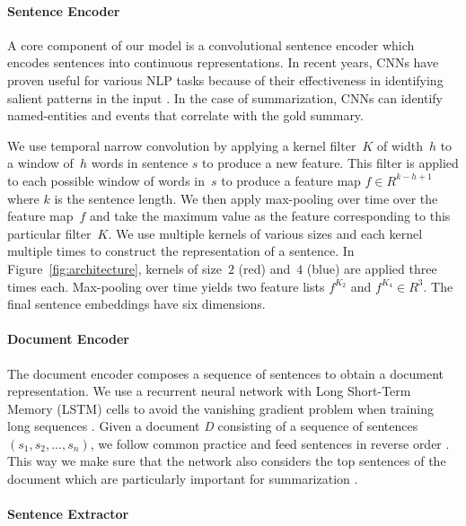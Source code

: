 \documentclass[11pt,a4paper]{article}
\newcommand\doc{{\it D }}
\begin{document}
\paragraph{Sentence Encoder}
A core component of our model is a convolutional sentence encoder
which encodes sentences into continuous representations. In recent
years, CNNs have proven useful for various NLP tasks
\cite{nlpscratch,kim-emnlp14,kalchbrenner-acl14,zhang-nips15,lei-emnlp15,kim-aaai16,jp-acl16}
because of their effectiveness in identifying salient patterns in the
input \cite{showattendtell}. In the case of summarization, CNNs can
identify named-entities and events that correlate with the gold
summary.

We use temporal narrow convolution by applying a kernel filter~$K$ of
width~$h$ to a window of~$h$ words in sentence $s$ to produce a new
feature. This filter is applied to each possible window of words
in~$s$ to produce a feature map $f \in R^{k-h+1}$ where $k$ is the
sentence length. We then apply max-pooling over time over the feature
map~$f$ and take the maximum value as the feature corresponding to
this particular filter~$K$. We use multiple kernels of various sizes
and each kernel multiple times to construct the representation of a
sentence.
In Figure~\ref{fig:architecture}, kernels of size~$2$ (red) and~$4$
(blue) are applied three times each. Max-pooling over time yields two
feature lists $f^{K_{2}}$ and $f^{K_{4}} \in R^3$. The final sentence
embeddings have six dimensions.

\paragraph{Document Encoder}

The document encoder composes a sequence of sentences to obtain a
document representation. We use a recurrent neural network with Long
Short-Term Memory (LSTM) cells to avoid the vanishing gradient problem
when training long sequences \cite{lstm}. Given a document \doc
consisting of a sequence of sentences $(s_1, s_2, \ldots , s_n)$, we
follow common practice and feed sentences in reverse order
\cite{sutskever-nips14,lijurafsky-acl15,katja-emnlp15,narayan-arxiv17}. This
way we make sure that the network also considers the top sentences of
the document which are particularly important for summarization
\cite{rush-acl15,nallapati-signll16}.

\paragraph{Sentence Extractor}
\end{document}
